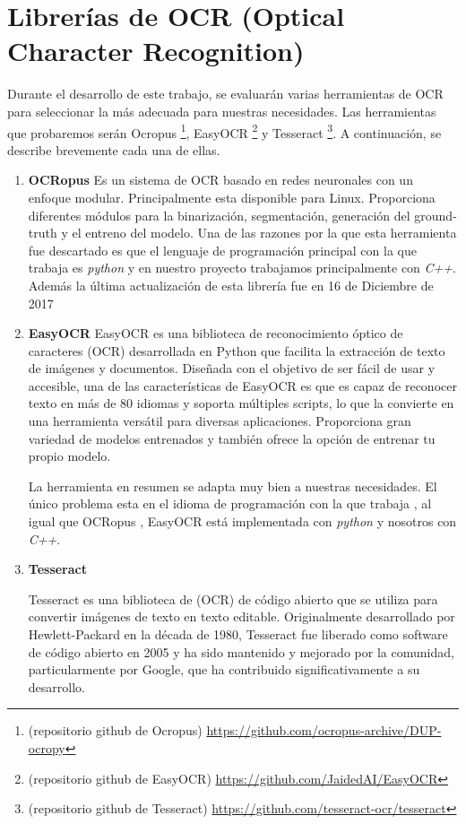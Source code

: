 \section{Librerías de OCR (Optical Character Recognition)}
\label{sec:Seleccion de libreria de OCR}
Durante el desarrollo de este trabajo, se evaluarán varias herramientas de OCR para seleccionar la más adecuada para nuestras necesidades. Las herramientas que probaremos serán Ocropus	\footnote{(repositorio github de Ocropus) \url{https://github.com/ocropus-archive/DUP-ocropy} }, EasyOCR	\footnote{(repositorio github de EasyOCR) \url{https://github.com/JaidedAI/EasyOCR} } y Tesseract	\footnote{(repositorio github de Tesseract) \url{https://github.com/tesseract-ocr/tesseract} }. A continuación, se describe brevemente cada una de ellas.
\begin{enumerate}
	\item \textbf{OCRopus}
	Es un sistema de OCR basado en redes neuronales con un enfoque modular.
	Principalmente esta disponible para Linux. Proporciona diferentes módulos para la binarización, segmentación, generación del ground-truth y el entreno del modelo.
	Una de las razones por la que esta herramienta fue descartado es que el lenguaje de programación principal con la que trabaja es \emph{python} y en nuestro proyecto trabajamos principalmente con \emph{C++}. Además la última actualización de esta librería fue en 16 de Diciembre de 2017
	
	\item \textbf{EasyOCR}
	EasyOCR es una biblioteca de reconocimiento óptico de caracteres (OCR) desarrollada en Python que facilita la extracción de texto de imágenes y documentos. Diseñada con el objetivo de ser fácil de usar y accesible, una de las características de EasyOCR es que es capaz de reconocer texto en más de 80 idiomas y soporta múltiples scripts, lo que la convierte en una herramienta versátil para diversas aplicaciones.
	Proporciona gran variedad de modelos entrenados y también ofrece la opción de entrenar tu propio modelo.
	
	La herramienta en resumen se adapta muy bien a nuestras necesidades. El único problema esta en el idioma de programación con la que trabaja , al igual que OCRopus , EasyOCR está implementada con \emph{python} y nosotros con \emph{C++}.
	
	\item \textbf{Tesseract}
	
	Tesseract es una biblioteca de (OCR) de código abierto que se utiliza para convertir imágenes de texto en texto editable. Originalmente desarrollado por Hewlett-Packard en la década de 1980, Tesseract fue liberado como software de código abierto en 2005 y ha sido mantenido y mejorado por la comunidad, particularmente por Google, que ha contribuido significativamente a su desarrollo.
	

\end{enumerate}

